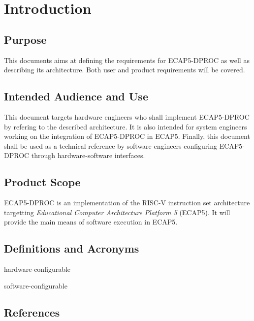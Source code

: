 \section{Introduction}
\subsection{Purpose}

\begin{content}
This documents aims at defining the requirements for ECAP5-DPROC as well as describing its architecture. Both user and product requirements will be covered.
\end{content}

\subsection{Intended Audience and Use}

\begin{content}
This document targets hardware engineers who shall implement ECAP5-DPROC by refering to the described architecture. It is also intended for system engineers working on the integration of ECAP5-DPROC in ECAP5. Finally, this document shall be used as a technical reference by software engineers configuring ECAP5-DPROC through hardware-software interfaces.
\end{content}

\subsection{Product Scope}

\begin{content}
  ECAP5-DPROC is an implementation of the RISC-V instruction set architecture targetting \textit{Educational Computer Architecture Platform 5} (ECAP5). It will provide the main means of software execution in ECAP5.
\end{content}

\subsection{Definitions and Acronyms}

\begin{content}
hardware-configurable

software-configurable
\end{content}

\subsection{References}

